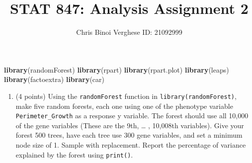 \documentclass[
]{article}
\title{STAT 847: Analysis Assignment 2}
\subtitle{Chris Binoi Verghese ID: 21092999}
\author{}
\date{\vspace{-2.5em}}
\newenvironment{Shaded}{\begin{snugshade}}{\end{snugshade}}
\newcommand{\AttributeTok}[1]{\textcolor[rgb]{0.13,0.29,0.53}{#1}}
\newcommand{\ConstantTok}[1]{\textcolor[rgb]{0.56,0.35,0.01}{#1}}
\newcommand{\ControlFlowTok}[1]{\textcolor[rgb]{0.13,0.29,0.53}{\textbf{#1}}}
\newcommand{\DecValTok}[1]{\textcolor[rgb]{0.00,0.00,0.81}{#1}}
\newcommand{\FunctionTok}[1]{\textcolor[rgb]{0.13,0.29,0.53}{\textbf{#1}}}
\newcommand{\NormalTok}[1]{#1}
\newcommand{\OtherTok}[1]{\textcolor[rgb]{0.56,0.35,0.01}{#1}}
\newcommand{\SpecialCharTok}[1]{\textcolor[rgb]{0.81,0.36,0.00}{\textbf{#1}}}
\newcommand{\StringTok}[1]{\textcolor[rgb]{0.31,0.60,0.02}{#1}}
\providecommand{\tightlist}{%
  \setlength{\itemsep}{0pt}\setlength{\parskip}{0pt}}
\begin{document}
\maketitle

\begin{Shaded}
\begin{Highlighting}[]
\FunctionTok{library}\NormalTok{(randomForest)}
\FunctionTok{library}\NormalTok{(rpart)}
\FunctionTok{library}\NormalTok{(rpart.plot)}
\FunctionTok{library}\NormalTok{(leaps)}
\FunctionTok{library}\NormalTok{(factoextra)}
\FunctionTok{library}\NormalTok{(car)}
\end{Highlighting}
\end{Shaded}

\begin{enumerate}
\def\labelenumi{\arabic{enumi}.}
\tightlist
\item
  (4 points) Using the \texttt{randomForest} function in
  \texttt{library(randomForest)}, make five random forests, each one
  using one of the phenotype variable \texttt{Perimeter\_Growth} as a
  response y variable. The forest should use all 10,000 of the gene
  variables (These are the 9th, \ldots{} , 10,008th variables). Give
  your forest 500 trees, have each tree use 300 gene variables, and set
  a minimum node size of 1. Sample with replacement. Report the
  percentage of variance explained by the forest using \texttt{print()}.
\end{enumerate}

\begin{Shaded}
\end{Shaded}
\end{document}

